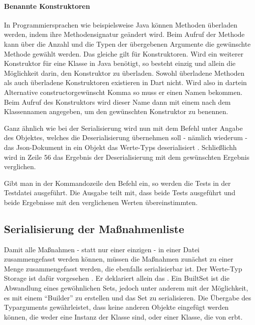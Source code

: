 \paragraph{Benannte Konstruktoren} In Programmiersprachen wie beispielsweise Java können Methoden überladen werden, indem ihre Methodensignatur geändert wird.
Beim Aufruf der Methode kann über die Anzahl und die Typen der übergebenen Argumente die gewünschte Methode gewählt werden.
Das gleiche gilt für Konstruktoren.
Wird ein weiterer Konstruktor für eine Klasse in Java benötigt, so besteht einzig und allein die Möglichkeit darin, den Konstruktor zu überladen.
Sowohl überladene Methoden als auch überladene Konstruktoren existieren in Dart nicht.
Wird also in dartein Alternative constructorgewünscht Komma so muss er einen Namen bekommen.
Beim Aufruf des Konstruktors wird dieser Name dann mit einem  nach dem Klassennamen angegeben, um den gewünschten Konstruktor zu benennen.


Ganz ähnlich wie bei der Serialisierung wird nun mit dem Befehl    unter Angabe des Objektes, welches die Deserialisierung übernehmen soll - nämlich wiederum  - das Json-Dokument in ein Objekt das Werte-Typs  deserialisiert . Schließlichh wird in Zeile 56 das Ergebnis der Deserialisierung mit dem gewünschten Ergebnis verglichen.



Gibt man in der Kommandozeile den Befehl    ein, so werden die Tests in der Testdatei ausgeführt. Die Ausgabe  teilt mit, dass beide Tests ausgeführt und beide Ergebnisse mit den verglichenen Werten übereinstimmten.

\subsection{Serialisierung der Maßnahmenliste}

Damit alle Maßnahmen - statt nur einer einzigen - in einer Datei zusammengefasst werden können, müssen die Maßnahmen zunächst zu einer Menge zusammengefasst werden, die ebenfalls serialisierbar ist.
Der Werte-Typ Storage ist dafür vorgesehen \Lst{\ref{lst:Schritt1WerteTypStorage}}.
Er deklariert allein das  .
Ein BuiltSet ist die Abwandlung eines gewöhnlichen Sets, jedoch unter anderem mit der Möglichkeit, es mit einem \enquote{Builder} zu erstellen und das Set zu serialisieren.
Die Übergabe des Typarguments  gewährleistet, dass keine anderen Objekte eingefügt werden können, die weder eine Instanz der Klasse  sind, oder einer Klasse, die von  erbt.

